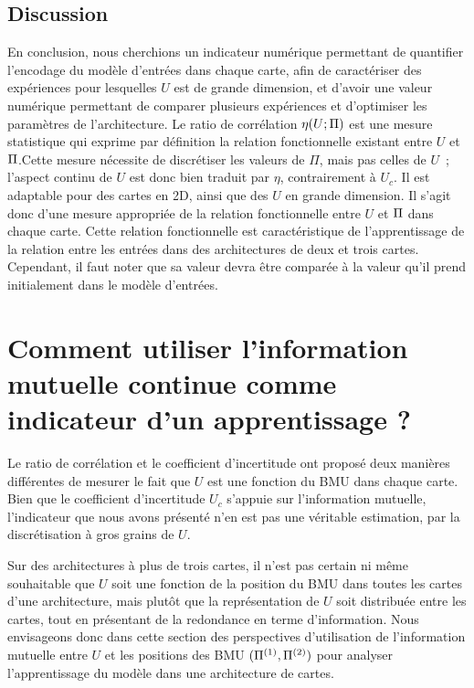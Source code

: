 \documentclass[../main]{subfiles}
\begin{document}
\subsection{Discussion}

En conclusion, nous cherchions un indicateur numérique permettant de quantifier l'encodage du modèle d'entrées dans chaque carte, afin de caractériser des expériences pour lesquelles $U$ est de grande dimension, et d'avoir une valeur numérique permettant de comparer plusieurs expériences et d'optimiser les paramètres de l'architecture.
Le ratio de corrélation $\eta(U;\Pi)$ est une mesure statistique qui exprime par définition la relation fonctionnelle existant entre $U$ et $\Pi$.Cette mesure nécessite de discrétiser les valeurs de $\Pi$, mais pas celles de $U$~; l'aspect continu de $U$ est donc bien traduit par $\eta$, contrairement à $U_c$.
Il est adaptable pour des cartes en 2D, ainsi que des $U$ en grande dimension.
Il s'agit donc d'une mesure appropriée de la relation fonctionnelle entre $U$ et $\Pi$ dans chaque carte.
Cette relation fonctionnelle est caractéristique de l'apprentissage de la relation entre les entrées dans des architectures de deux et trois cartes.
Cependant, il faut noter que sa valeur devra être comparée à la valeur qu'il prend initialement dans le modèle d'entrées.

\section{Comment utiliser l'information mutuelle continue comme indicateur d'un apprentissage ?}

Le ratio de corrélation et le coefficient d'incertitude ont proposé deux manières différentes de mesurer le fait que $U$ est une fonction du BMU dans chaque carte.
Bien que le coefficient d'incertitude $U_c$ s'appuie sur l'information mutuelle, l'indicateur que nous avons présenté n'en est pas une véritable estimation, par la discrétisation à gros grains de $U$.

Sur des architectures à plus de trois cartes, il n'est pas certain ni même souhaitable que $U$ soit une fonction de la position du BMU dans toutes les cartes d'une architecture, mais plutôt que la représentation de $U$ soit distribuée entre les cartes, tout en présentant de la redondance en terme d'information.
Nous envisageons donc dans cette section des perspectives d'utilisation de l'information mutuelle entre $U$ et les positions des BMU $(\Pi^{({1})}, \Pi^{({2})})$ pour analyser l'apprentissage du modèle dans une architecture de cartes.
\end{document}
